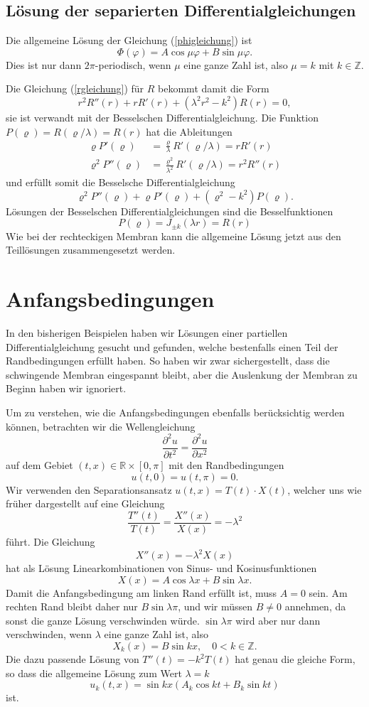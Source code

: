 \subsection{Lösung der separierten Differentialgleichungen}
Die allgemeine Lösung der Gleichung (\ref{phigleichung}) ist
\[
\Phi(\varphi)=A\cos\mu\varphi +B\sin\mu\varphi.
\]
Dies ist nur dann $2\pi$-periodisch, wenn $\mu$ eine ganze
Zahl ist, also $\mu=k$ mit $k\in\mathbb Z$.

Die Gleichung (\ref{rgleichung}) für $R$ bekommt damit die Form
\[
r^2R''(r)+rR'(r)+(\lambda^2 r^2-k^2)R(r)=0,
\]
sie ist verwandt mit der Besselschen Differentialgleichung.
Die Funktion $P(\varrho)=R(\varrho/\lambda)=R(r)$ hat die Ableitungen
\begin{align*}
\varrho P'(\varrho)&=\frac{\varrho}{\lambda}R'(\varrho/\lambda)=rR'(r)\\
\varrho^2 P''(\varrho)&=\frac{\varrho^2}{\lambda^2}R'(\varrho/\lambda)=r^2R''(r)
\end{align*}
und erfüllt somit die Besselsche Differentialgleichung
\[
\varrho^2P''(\varrho)+\varrho P'(\varrho)+(\varrho^2-k^2)P(\varrho).
\]
Lösungen der Besselschen Differentialgleichungen sind die Besselfunktionen
\[
P(\varrho)=J_{\pm k}(\lambda r)=R(r)
\]
Wie bei der rechteckigen Membran kann die allgemeine Lösung jetzt aus
den Teillösungen zusammengesetzt werden.

\section{Anfangsbedingungen}
In den bisherigen Beispielen haben wir Lösungen einer partiellen
Differentialgleichung gesucht und gefunden, welche bestenfalls einen
Teil der Randbedingungen erfüllt haben.
So haben wir zwar sichergestellt, dass die schwingende Membran eingespannt
bleibt, aber die Auslenkung der Membran zu Beginn haben wir ignoriert.

Um zu verstehen, wie die Anfangsbedingungen ebenfalls berücksichtig
werden können, betrachten wir die Wellengleichung
\[
\frac{\partial^2 u}{\partial t^2}=\frac{\partial^2 u}{\partial x^2}
\]
auf dem Gebiet $(t,x)\in\mathbb R\times [0,\pi]$
mit den Randbedingungen
\[
u(t,0)=u(t,\pi)=0.
\]
Wir verwenden den Separationsansatz
$u(t,x)=T(t)\cdot X(t)$, welcher uns wie früher dargestellt auf eine
Gleichung
\[
\frac{T''(t)}{T(t)}=\frac{X''(x)}{X(x)}=-\lambda^2
\]
führt.
Die Gleichung 
\[
X''(x)=-\lambda^2 X(x)
\]
hat als Lösung Linearkombinationen von Sinus- und Kosinusfunktionen
\[
X(x)=A\cos\lambda x+B\sin\lambda x.
\]
Damit die Anfangsbedingung am linken Rand erfüllt ist, muss $A=0$
sein. Am rechten Rand bleibt daher nur $B\sin\lambda \pi$, und wir
müssen $B\ne 0$ annehmen, da sonst die ganze Lösung verschwinden
würde. $\sin\lambda \pi$ wird aber nur dann verschwinden, wenn
$\lambda$ eine ganze Zahl ist, also
\[
X_k(x)=B\sin kx, \quad 0<k\in\mathbb Z.
\]
Die dazu passende Lösung von $T''(t)=-k^2T(t)$ hat genau die
gleiche Form, so dass die allgemeine Lösung zum Wert $\lambda=k$
\[
u_k(t,x)=\sin kx\left(A_k\cos kt+B_k\sin kt\right)
\]
ist.

